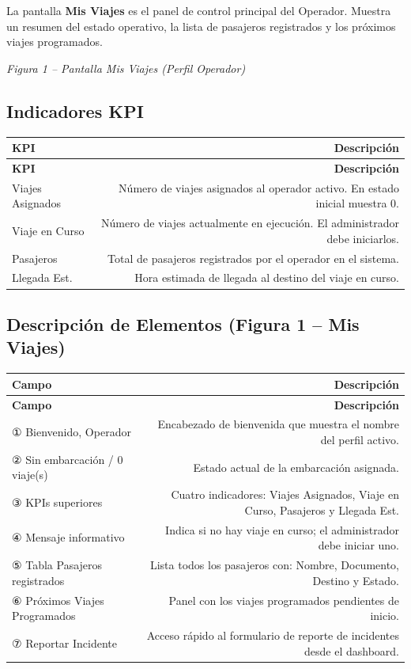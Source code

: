 \documentclass[12pt,a4paper]{article}
\begin{document}
La pantalla \textbf{Mis Viajes} es el panel de control principal del Operador. Muestra un resumen del estado operativo, la lista de pasajeros registrados y los próximos viajes programados.

\textit{Figura 1 -- Pantalla Mis Viajes (Perfil Operador)}

\subsection{Indicadores KPI}

\begin{longtable}{LR}
  \toprule
  \textbf{KPI} & \textbf{Descripción} \\
  \midrule
  \endfirsthead
  \toprule
  \textbf{KPI} & \textbf{Descripción} \\
  \midrule
  \endhead
  \bottomrule
  \endfoot
  Viajes Asignados & Número de viajes asignados al operador activo. En estado inicial muestra 0. \\[4pt]
  Viaje en Curso   & Número de viajes actualmente en ejecución. El administrador debe iniciarlos. \\[4pt]
  Pasajeros        & Total de pasajeros registrados por el operador en el sistema. \\[4pt]
  Llegada Est.     & Hora estimada de llegada al destino del viaje en curso. \\
\end{longtable}

\subsection{Descripción de Elementos (Figura 1 -- Mis Viajes)}

\begin{longtable}{LR}
  \toprule
  \textbf{Campo} & \textbf{Descripción} \\
  \midrule
  \endfirsthead
  \toprule
  \textbf{Campo} & \textbf{Descripción} \\
  \midrule
  \endhead
  \bottomrule
  \endfoot
  ① Bienvenido, Operador          & Encabezado de bienvenida que muestra el nombre del perfil activo. \\[4pt]
  ② Sin embarcación / 0 viaje(s)  & Estado actual de la embarcación asignada. \\[4pt]
  ③ KPIs superiores               & Cuatro indicadores: Viajes Asignados, Viaje en Curso, Pasajeros y Llegada Est. \\[4pt]
  ④ Mensaje informativo           & Indica si no hay viaje en curso; el administrador debe iniciar uno. \\[4pt]
  ⑤ Tabla Pasajeros registrados   & Lista todos los pasajeros con: Nombre, Documento, Destino y Estado. \\[4pt]
  ⑥ Próximos Viajes Programados   & Panel con los viajes programados pendientes de inicio. \\[4pt]
  ⑦ Reportar Incidente            & Acceso rápido al formulario de reporte de incidentes desde el dashboard. \\
\end{longtable}
\end{document}
